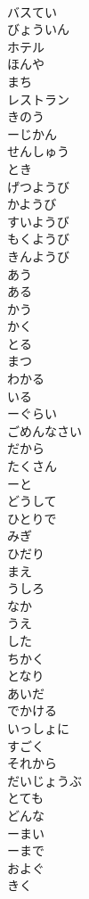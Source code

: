 \documentclass[8pt]{extreport}
\begin{document}
\begin{CJK}{UTF8}{min}
\\	バスてい	
\\	びょういん	
\\	ホテル	
\\	ほんや	
\\	まち	
\\	レストラン	
\\	きのう	
\\	ーじかん	
\\	せんしゅう	
\\	とき	
\\	げつようび	
\\	かようび	
\\	すいようび	
\\	もくようび	
\\	きんようび	
\\	あう	
\\	ある	
\\	かう	
\\	かく	
\\	とる	
\\	まつ	
\\	わかる	
\\	いる	
\\	ーぐらい	
\\	ごめんなさい	
\\	だから	
\\	たくさん	
\\	ーと	
\\	どうして	
\\	ひとりで	
\\	みぎ	
\\	ひだり	
\\	まえ	
\\	うしろ	
\\	なか	
\\	うえ	
\\	した	
\\	ちかく	
\\	となり	
\\	あいだ	
\\	でかける	
\\	いっしょに	
\\	すごく	
\\	それから	
\\	だいじょうぶ	
\\	とても	
\\	どんな	
\\	ーまい	
\\	ーまで	
\\	およぐ	
\\	きく	

\end{CJK}
\end{document}
